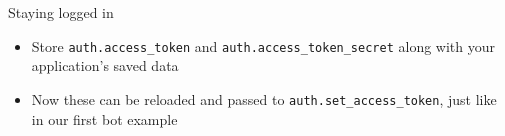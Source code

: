 \begin{frame}{Staying logged in}
    \begin{itemize}
        \item Store \lstinline{auth.access_token} and \lstinline{auth.access_token_secret} along with your
            application's saved data \pause
        \item Now these can be reloaded and passed to \lstinline{auth.set_access_token},
            just like in our first bot example
    \end{itemize}
\end{frame}

